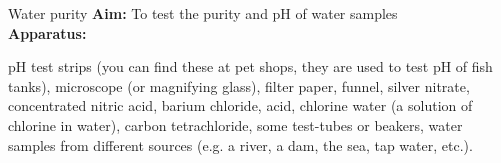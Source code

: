 \par 
\label{m38138*id08321}
            \begin{g_experiment}{Water purity}
            \nopagebreak
            \label{m38138*id08341}\noindent{}\textbf{Aim:}\newline
To test the purity and pH of water samples
\\
\label{m38138*id083244}\noindent{}\textbf{Apparatus:}\\
\begin{minipage}{.5\textwidth}
pH test strips (you can find these at pet shops, they are used to test pH of fish tanks), microscope (or magnifying glass), filter paper, funnel, silver nitrate, concentrated nitric acid, barium chloride, acid, chlorine water (a solution of chlorine in water), carbon tetrachloride, some test-tubes or beakers, water samples from different sources (e.g. a river, a dam, the sea, tap water, etc.).
\end{minipage}
\begin{minipage}{.5\textwidth}


\end{minipage}
\end{g_experiment}
